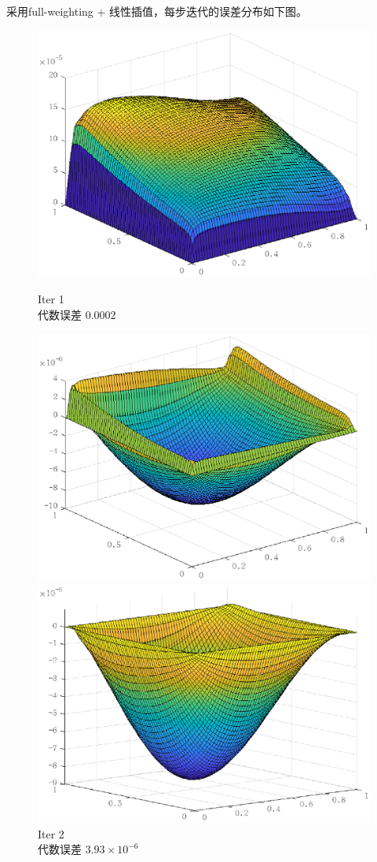 \documentclass[lang=cn,10pt]{elegantbook}
\begin{document}
采用full-weighting + 线性插值，每步迭代的误差分布如下图。
\begin{figure}[H]
  \centering
  \begin{minipage}[t]{0.22\linewidth}
      \centering
      \includegraphics[width=0.84\linewidth]{figure/2-5-5.eps}
      \caption*{\small Iter 1 \\ 代数误差 $0.0002$}
  \end{minipage}
  \hspace{1em}
  \begin{minipage}[t]{0.22\linewidth}
    \centering
    \includegraphics[width=0.84\linewidth]{figure/2-5-6.eps}
    \caption*{\small Iter 2 \\ 代数误差 $3.93\times 10^{-6}$}
  \end{minipage}
  \hspace{1em}
  \begin{minipage}[t]{0.22\linewidth}
    \centering
    \includegraphics[width=0.84\linewidth]{figure/2-5-7.eps}

\end{minipage}
\end{figure}
\end{document}
